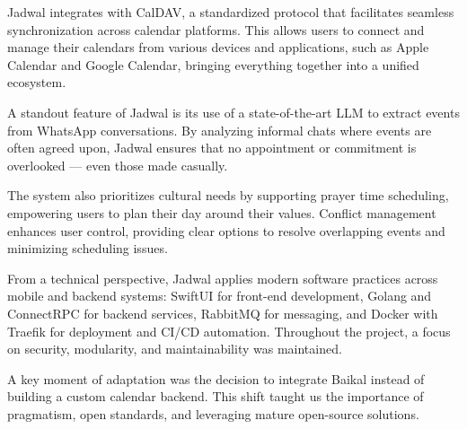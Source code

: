 \documentclass[12pt,a4paper,twoside]{report}
\begin{document}
Jadwal integrates with CalDAV, a standardized protocol that facilitates seamless synchronization across calendar platforms. This allows users to connect and manage their calendars from various devices and applications, such as Apple Calendar and Google Calendar, bringing everything together into a unified ecosystem.

A standout feature of Jadwal is its use of a state-of-the-art LLM to extract events from WhatsApp conversations. By analyzing informal chats where events are often agreed upon, Jadwal ensures that no appointment or commitment is overlooked — even those made casually.

The system also prioritizes cultural needs by supporting prayer time scheduling, empowering users to plan their day around their values. Conflict management enhances user control, providing clear options to resolve overlapping events and minimizing scheduling issues.

From a technical perspective, Jadwal applies modern software practices across mobile and backend systems: SwiftUI for front-end development, Golang and ConnectRPC for backend services, RabbitMQ for messaging, and Docker with Traefik for deployment and CI/CD automation. Throughout the project, a focus on security, modularity, and maintainability was maintained.

A key moment of adaptation was the decision to integrate Baikal instead of building a custom calendar backend. This shift taught us the importance of pragmatism, open standards, and leveraging mature open-source solutions.
\end{document}
